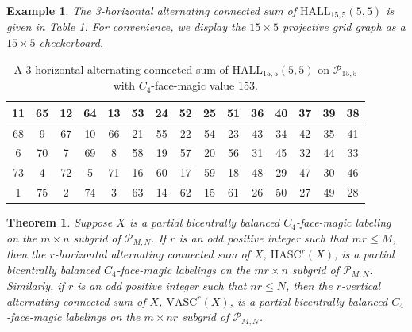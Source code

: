\documentclass[12pt]{amsart}
\theoremstyle{definition}
\theoremstyle{plain}
\newtheorem{theorem}[definition]{Theorem}
\newtheorem{example}[definition]{Example}
\begin{document}
\begin{example}
  The 3-horizontal alternating connected sum of $\mathrm{HALL}_{15,5}(5,5)$ is given in Table \ref{tableHorizontalAltConnSumofHALLexample}.
  For convenience, we display the $15 \times 5$ projective grid graph as a $15 \times 5$ checkerboard.
\end{example}

\begin{table}[h]
\hspace{0.0in}\begin{tabular}{|c|c|c|c|c|c|c|c|c|c|c|c|c|c|c|}
\hline
11  &65  &12   &64  &13  &53  &24  &52  &25   &51  &36  &40  &37  &39  &38   \\[0.05in]
\hline
68  &9   &67   &10  &66  &21  &55  &22  &54   &23  &43  &34  &42  &35  &41  \\[0.05in]
\hline
6   &70  &7    &69  &8   &58  &19  &57  &20   &56  &31  &45  &32  &44  &33   \\[0.05in]
\hline
73  &4   &72   &5   &71  &16  &60  &17  &59   &18  &48  &29  &47  &30  &46    \\[0.05in]
\hline
1    &75  &2   &74  &3   &63  &14  &62  &15   &61  &26  &50  &27  &49  &28    \\[0.05in]
\hline
\end{tabular}
\caption{A 3-horizontal alternating connected sum of $\mathrm{HALL}_{15,5}(5,5)$ on $\mathcal{P}_{15,5}$ with $C_4$-face-magic value 153.}
\label{tableHorizontalAltConnSumofHALLexample}
\end{table}



\begin{theorem} \label{thmHASCandVASCareBicentrallyBalanced}
  Suppose $X$ is a partial  bicentrally balanced $C_4$-face-magic labeling on the $m \times n$ subgrid of $\mathcal{P}_{M,N}$.
  If $r$ is an odd positive integer such that $mr\leqslant M$, then
  the $r$-horizontal alternating connected sum of $X$, $\mathrm{HASC}^r(X)$, is a partial  bicentrally balanced $C_4$-face-magic labelings on the $mr \times n$ subgrid of $\mathcal{P}_{M,N}$.
  Similarly, if $r$ is an odd positive integer such that $nr\leqslant N$, then
  the $r$-vertical alternating connected sum of $X$, $\mathrm{VASC}^r(X)$, is a partial  bicentrally balanced $C_4$-face-magic labelings on the $m \times nr$ subgrid of $\mathcal{P}_{M,N}$.
\end{theorem}
\end{document}
